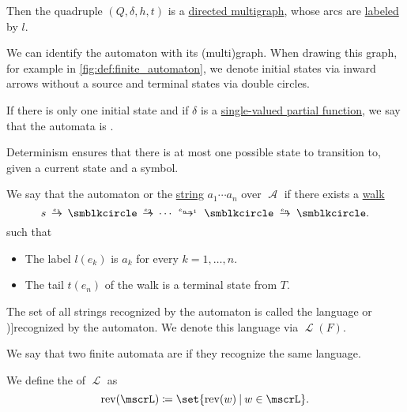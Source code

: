 \begin{definition}
\begin{thmenum}
    Then the quadruple \( (Q, \delta, h, t) \) is a \hyperref[def:directed_multigraph]{directed multigraph}, whose arcs are \hyperref[def:labeled_set]{labeled} by \( l \).

    We can identify the automaton with its (multi)graph. When drawing this graph, for example in \cref{fig:def:finite_automaton}, we denote initial states via inward arrows without a source and terminal states via double circles.

     If there is only one initial state and if \( \delta \) is a \hyperref[def:set_valued_map/partial]{single-valued partial function}, we say that the automata is .

    Determinism ensures that there is at most one possible state to transition to, given a current state and a symbol.

     We say that the automaton  or  the \hyperref[def:formal_language/string]{string} \( a_1 \cdots a_n \) over \( \mscrA \) if there exists a \hyperref[def:graph_walk/directed]{walk}
    \begin{equation*}
      s \reloset {e_1} \to \anon \reloset {e_2} \to \cdots \reloset {e_{n-1}} \to \anon \reloset {e_n} \to \anon.
    \end{equation*}
    such that
    \begin{itemize}
      \item The label \( l(e_k) \) is \( a_k \) for every \( k = 1, \ldots, n \).
      \item The tail \( t(e_n) \) of the walk is a terminal state from \( T \).
    \end{itemize}

     The set of all strings recognized by the automaton is called the language  or \term[ru=(язык) распознается (автоматом) (\cite[45]{Гладкий1973ГрамматикиИЯзыки})]{recognized} by the automaton. We denote this language via \( \mscrL(F) \).

     We say that two finite automata are  if they recognize the same language.
  \end{thmenum}
\end{definition}

\begin{definition}\label{def:reverse_language}\mimprovised
  We define the  of \( \mscrL \) as
  \begin{equation*}
    \op{rev}(\mscrL) \coloneqq \set{ \op{rev}(w) \given w \in \mscrL }.
  \end{equation*}
\end{definition}


